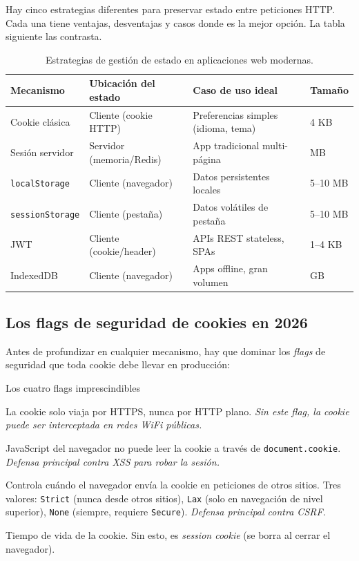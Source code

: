 \documentclass[11pt,a4paper,openany]{book}
\begin{document}
Hay cinco estrategias diferentes para preservar estado entre
peticiones HTTP. Cada una tiene ventajas, desventajas y casos donde
es la mejor opción. La tabla siguiente las contrasta.


\begin{table}[htbp]
\centering
\caption{Estrategias de gestión de estado en aplicaciones web modernas.}
\footnotesize
\begin{tabularx}{\textwidth}{lXXl}
\toprule
\textbf{Mecanismo} & \textbf{Ubicación del estado} & \textbf{Caso de uso ideal} & \textbf{Tamaño}\\
\midrule
Cookie clásica & Cliente (cookie HTTP) & Preferencias simples (idioma, tema) & 4 KB\\
Sesión servidor & Servidor (memoria/Redis) & App tradicional multi-página & MB \\
\texttt{localStorage} & Cliente (navegador) & Datos persistentes locales & 5--10 MB\\
\texttt{sessionStorage} & Cliente (pestaña) & Datos volátiles de pestaña & 5--10 MB\\
JWT & Cliente (cookie/header) & APIs REST stateless, SPAs & 1--4 KB\\
IndexedDB & Cliente (navegador) & Apps offline, gran volumen & GB\\
\bottomrule
\end{tabularx}
\end{table}

\subsection{Los flags de seguridad de cookies en 2026}

Antes de profundizar en cualquier mecanismo, hay que dominar los
\emph{flags} de seguridad que toda cookie debe llevar en producción:

\begin{cajadefinicion}{Los cuatro flags imprescindibles}
\begin{description}[leftmargin=1.5cm]
\item[\texttt{Secure}.] La cookie solo viaja por HTTPS, nunca por HTTP
plano. \emph{Sin este flag, la cookie puede ser interceptada en redes
WiFi públicas.}
\item[\texttt{HttpOnly}.] JavaScript del navegador no puede leer la
cookie a través de \texttt{document.cookie}. \emph{Defensa principal
contra XSS para robar la sesión.}
\item[\texttt{SameSite}.] Controla cuándo el navegador envía la cookie
en peticiones de otros sitios. Tres valores: \texttt{Strict} (nunca
desde otros sitios), \texttt{Lax} (solo en navegación de nivel
superior), \texttt{None} (siempre, requiere \texttt{Secure}).
\emph{Defensa principal contra CSRF.}
\item[\texttt{Max-Age} o \texttt{Expires}.] Tiempo de vida de la
cookie. Sin esto, es \emph{session cookie} (se borra al cerrar el
navegador).
\end{description}
\end{cajadefinicion}
\end{document}
